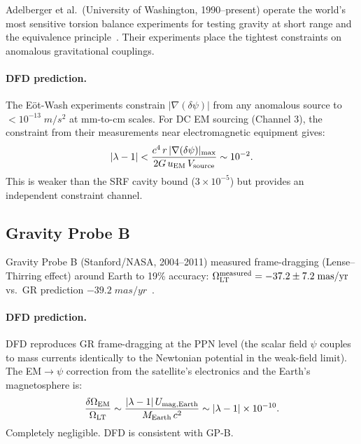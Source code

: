 \documentclass[aps,prd,twocolumn,superscriptaddress,floatfix,nofootinbib]{revtex4-2}
\newcommand{\lam}{\lambda}
\begin{document}
Adelberger et al.\ (University of Washington, 1990--present) operate the
world's most sensitive torsion balance experiments for testing gravity
at short range and the equivalence principle~\cite{Adelberger2009}.
Their experiments place the tightest constraints on anomalous
gravitational couplings.

\paragraph{DFD prediction.}
The E\"ot-Wash experiments constrain $|\nabla(\delta\psi)|$ from any
anomalous source to $< 10^{-13}\;\si{m/s^2}$ at mm-to-cm scales.
For DC EM sourcing (Channel 3), the constraint from their measurements
near electromagnetic equipment gives:
\begin{equation}
|\lam-1| < \frac{c^4\,r\,|\nabla(\delta\psi)|_{\rm max}}
{2G\,u_{\rm EM}\,V_{\rm source}}
\sim 10^{-2}.
\end{equation}
This is weaker than the SRF cavity bound ($3\times10^{-5}$) but
provides an independent constraint channel.

\subsection{Gravity Probe B}\label{sec:gpb}

Gravity Probe B (Stanford/NASA, 2004--2011) measured frame-dragging
(Lense--Thirring effect) around Earth to 19\% accuracy:
$\Omega_{\rm LT}^{\rm measured} = -37.2 \pm 7.2\;\si{mas/yr}$
vs.\ GR prediction $-39.2\;\si{mas/yr}$~\cite{Everitt2011}.

\paragraph{DFD prediction.}
DFD reproduces GR frame-dragging at the PPN level (the scalar field
$\psi$ couples to mass currents identically to the Newtonian potential
in the weak-field limit). The EM$\to\psi$ correction from the satellite's
electronics and the Earth's magnetosphere is:
\begin{equation}
\frac{\delta\Omega_{\rm EM}}{\Omega_{\rm LT}} \sim
\frac{|\lam-1|\,U_{\rm mag,Earth}}{M_{\rm Earth}\,c^2}
\sim |\lam-1| \times 10^{-10}.
\end{equation}
Completely negligible. DFD is consistent with GP-B.
\end{document}
